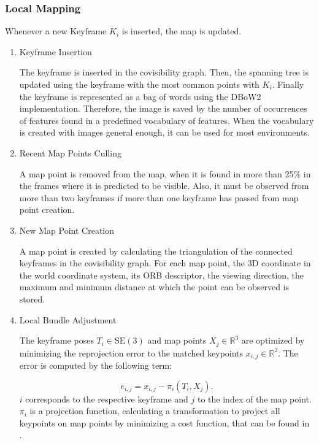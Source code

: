 	\subsubsection{Local Mapping}
	
	Whenever a new Keyframe $K_i$ is inserted, the map is updated. 
	
	
	\begin{enumerate}
	\item{Keyframe Insertion} \label{bagofword}
	
	The keyframe is inserted in the covisibility graph. Then, the spanning tree
	is updated using the keyframe with the most common points with $K_i$.
	Finally the keyframe is represented as a bag of words using the DBoW2 implementation. 
	Therefore, the image is saved by the number of occurrences of features found in a predefined
	vocabulary of features. When the vocabulary is created with images general enough, 
	it can be used for most environments.

	
	\item{Recent Map Points Culling}
	
	A map point is removed from the map, when it is found in more than 
	25\% in the frames where it is predicted to be visible. Also, 
	it must be observed from more than two keyframes if more than one keyframe 
	has passed from map point creation. 
	
	\item{New Map Point Creation}
	
	A map point is created by calculating the triangulation of the connected
	keyframes in the covisibility graph. For each map point, the 3D coordinate 
	in the world coordinate system, its ORB descriptor, the viewing direction, 
	the maximum and minimum distance at which the point can be observed is stored. 
	
	\item{Local Bundle Adjustment}
	
	The keyframe poses $T_i \in \text{SE}(3)$ and map points $X_j \in \mathbb{R}^{3}$ 
	are optimized by minimizing the reprojection error to the matched keypoints $x_{i,j} \in \mathbb{R}^{2}$.
	The error is computed by the following term:
	
	$$ e_{i,j} = x_{i,j} - \pi_i\left(T_i, X_j\right). $$ 
	$i$ corresponds to the respective keyframe and $j$ to the index of the map point. 
	$\pi_i$ is a projection function, calculating a transformation 
	to project all keypoints on map points by minimizing a cost function, that
	can be found in \cite{ba}.


\end{enumerate}

